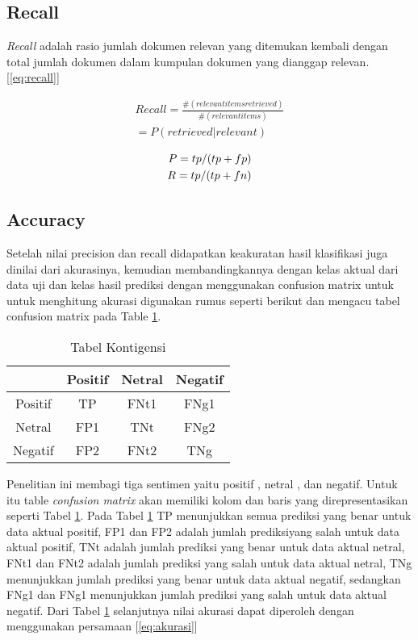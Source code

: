 \subsection*{Recall}
\textit{Recall} adalah rasio jumlah dokumen relevan yang ditemukan kembali dengan total jumlah dokumen dalam kumpulan dokumen yang dianggap relevan. [\ref{eq:recall}]

\begin{equation}
\begin{split}
Recall = \frac{\#(relevant items retrieved)}{\#(relevant items)} \\ 
= P(retrieved|relevant)
\label{eq:recall}
\end{split}
\end{equation}


\begin{equation}
\begin{split}
\tiny
P = tp/(tp+fp) \\ 
R = tp/(tp+fn)
\label{eq:evaluasi}
\normalsize
\end{split}
\end{equation}

\subsection*{Accuracy}
Setelah nilai precision dan recall didapatkan keakuratan hasil klasifikasi juga dinilai dari akurasinya, kemudian membandingkannya dengan kelas aktual dari data uji dan kelas hasil prediksi dengan menggunakan confusion matrix untuk untuk menghitung akurasi digunakan rumus seperti berikut dan mengacu tabel confusion matrix pada Table \ref{tab:konsep}. 

\begin{table}[hbt]
	\caption{Tabel Kontigensi}
	\centering
	\begin{adjustbox}{max width=\textwidth}
		\begin{tabular}{*{4}{c}}%
			\toprule
			 & Positif & Netral & Negatif \\
			\midrule
			Positif & TP & FNt1 & FNg1 \\
			Netral & FP1 & TNt & FNg2 \\
			Negatif & FP2 & FNt2 & TNg \\
			\bottomrule
		\end{tabular}
	\end{adjustbox}
	\label{tab:konsep}
\end{table}

Penelitian ini membagi tiga sentimen yaitu positif , netral , dan negatif. Untuk itu table \textit{confusion matrix} akan memiliki kolom dan baris yang direpresentasikan seperti Tabel \ref{tab:konsep}. Pada Tabel \ref{tab:konsep} TP menunjukkan semua prediksi yang benar untuk data aktual positif, FP1 dan FP2 adalah jumlah prediksiyang salah untuk data aktual positif, TNt adalah jumlah prediksi yang benar untuk data aktual netral, FNt1 dan FNt2 adalah jumlah prediksi yang salah untuk data aktual netral, TNg menunjukkan jumlah prediksi yang benar untuk data aktual negatif, sedangkan FNg1 dan FNg1 menunjukkan jumlah prediksi yang salah untuk data aktual negatif. Dari Tabel \ref{tab:konsep} selanjutnya nilai akurasi dapat diperoleh dengan menggunakan persamaan [\ref{eq:akurasi}]

